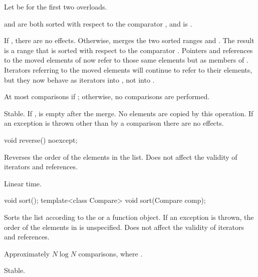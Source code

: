 \begin{itemdescr}
\pnum
Let  be  for the first two overloads.

\pnum
\expects
{} and  are both sorted
with respect to the comparator , and
 is .

\pnum
\effects
If , there are no effects.
Otherwise, merges
the two sorted ranges  and .
The result is a range
that is sorted with respect to the comparator .
Pointers and references to the moved elements of  now refer to those same elements
but as members of . Iterators referring to the moved elements will continue to
refer to their elements, but they now behave as iterators into , not into
.

\pnum
\complexity
At most  comparisons
if ;
otherwise, no comparisons are performed.

\pnum
\remarks
Stable.
If ,  is empty after the merge.
No elements are copied by this operation.
If an exception is thrown other than by a comparison there are no effects.
\end{itemdescr}

%
\begin{itemdecl}
void reverse() noexcept;
\end{itemdecl}

\begin{itemdescr}
\pnum
\effects
Reverses the order of the elements in the list.
Does not affect the validity of iterators and references.

\pnum
\complexity
Linear time.
\end{itemdescr}

%
\begin{itemdecl}
void sort();
template<class Compare> void sort(Compare comp);
\end{itemdecl}

\begin{itemdescr}
\pnum
\effects
Sorts the list according to the  or a  function object.
If an exception is thrown,
the order of the elements in  is unspecified.
Does not affect the validity of iterators and references.

\pnum
\complexity
Approximately
$N \log N$
comparisons, where
.

\pnum
\remarks
Stable.
\end{itemdescr}

